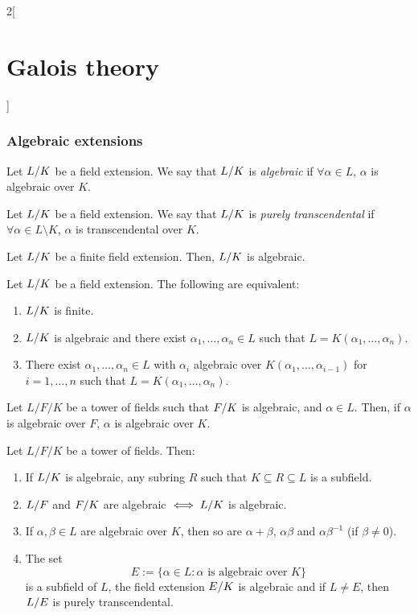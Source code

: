 \documentclass[../../../main.tex]{subfiles}
\begin{document}
\begin{multicols}{2}[\section{Galois theory}]
  \subsubsection{Algebraic extensions}
  \begin{definition}
    Let $\quot{L}{K}$ be a field extension. We say that $\quot{L}{K}$ is \emph{algebraic} if $\forall\alpha\in L$, $\alpha$ is algebraic over $K$.
  \end{definition}
  \begin{definition}
    Let $\quot{L}{K}$ be a field extension. We say that $\quot{L}{K}$ is \emph{purely transcendental} if $\forall\alpha\in L\setminus K$, $\alpha$ is transcendental over $K$.
  \end{definition}
  \begin{lemma}
    Let $\quot{L}{K}$ be a finite field extension. Then, $\quot{L}{K}$ is algebraic.
  \end{lemma}
  \begin{prop}
    Let $\quot{L}{K}$ be a field extension. The following are equivalent:
    \begin{enumerate}
      \item $\quot{L}{K}$ is finite.
      \item $\quot{L}{K}$ is algebraic and there exist $\alpha_1,\ldots,\alpha_n\in L$ such that $L=K(\alpha_1,\ldots,\alpha_n)$.
      \item There exist $\alpha_1,\ldots,\alpha_n\in L$ with $\alpha_i$ algebraic over $K(\alpha_1,\ldots,\alpha_{i-1})$ for $i=1,\ldots,n$ such that $L=K(\alpha_1,\ldots,\alpha_n)$.
    \end{enumerate}
  \end{prop}
  \begin{prop}
    Let $L/F/K$ be a tower of fields such that $\quot{F}{K}$ is algebraic, and $\alpha\in L$. Then, if $\alpha$ is algebraic over $F$, $\alpha$ is algebraic over $K$.
  \end{prop}
  \begin{prop}
    Let $L/F/K$ be a tower of fields. Then:
    \begin{enumerate}
      \item If $\quot{L}{K}$ is algebraic, any subring $R$ such that $K\subseteq R\subseteq L$ is a subfield.
      \item $\quot{L}{F}$ and $\quot{F}{K}$ are algebraic $\iff\quot{L}{K}$ is algebraic.
      \item If $\alpha,\beta\in L$ are algebraic over $K$, then so are $\alpha+\beta$, $\alpha\beta$ and $\alpha\beta^{-1}$ (if $\beta\ne 0$).
      \item The set $$E:=\{\alpha\in L:\alpha\text{ is algebraic over }K\}$$ is a subfield of $L$, the field extension $\quot{E}{K}$ is algebraic and if $L\ne E$, then $\quot{L}{E}$ is purely transcendental.
    \end{enumerate}
  \end{prop}

\end{multicols}
\end{document}
